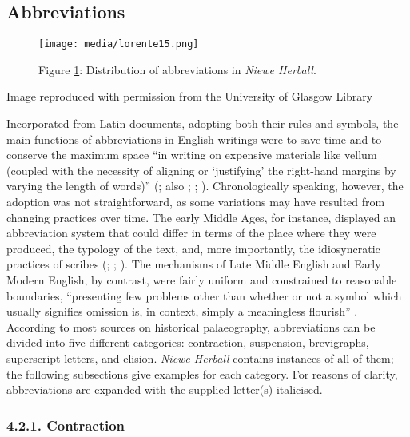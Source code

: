 \documentclass{article}
\begin{document}
\subsection{Abbreviations}

\begin{figure}[H]
    \centering
    \texttt{[image: media/lorente15.png]}
    \caption{Figure \ref{fig:lorente15}: Distribution of abbreviations in \emph{Niewe Herball}.}
    \label{fig:lorente15}
\end{figure}


 Image reproduced with permission from the University of Glasgow Library 


 
Incorporated from Latin documents, adopting both their rules and
symbols, the main functions of abbreviations in English writings were to
save time and to conserve the maximum space ``in writing on expensive
materials like vellum (coupled with the necessity of aligning or
`justifying' the right-hand margins by varying the length of words)''
(\cite[218]{greetham_textual_1994}; also \cite[119]{tannenbaum_handwriting_1930}; \cite[22]{petti_english_1977};
\cite[115]{calle-martin_corpus-based_2021}). Chronologically speaking, however, the adoption
was not straightforward, as some variations may have resulted from changing practices over time. The early Middle Ages, for
instance, displayed an abbreviation system that could differ in terms of
the place where they were produced, the typology of the text, and, more
importantly, the idiosyncratic practices of scribes (\cite[22]{petti_english_1977};
\cite[187]{derolez_palaeography_2003}; \cite[89]{clemens_introduction_2007}). The mechanisms of Late
Middle English and Early Modern English, by contrast, were fairly
uniform and constrained to reasonable boundaries, ``presenting few
problems other than whether or not a symbol which usually signifies
omission is, in context, simply a meaningless flourish'' \citep[22]{petti_english_1977}. According to most sources on historical
palaeography, abbreviations can be divided into five different categories: contraction, suspension,
brevigraphs, superscript letters, and elision. \emph{Niewe Herball}
contains instances of all of them; the following subsections give examples for each category. For reasons of clarity, abbreviations are
  expanded with the supplied letter(s) italicised.

\subsubsection{4.2.1. Contraction}
\end{document}
